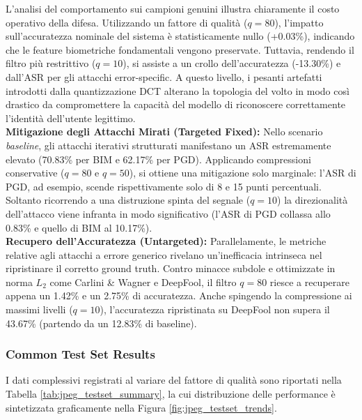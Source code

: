 \documentclass[a4paper, 12pt]{article}
\begin{document}
L'analisi del comportamento sui campioni genuini illustra chiaramente il costo operativo della difesa. 
Utilizzando un fattore di qualità ($q=80$), l'impatto sull'accuratezza nominale del sistema è statisticamente 
nullo (+0.03\%), indicando che le feature biometriche fondamentali vengono preservate. 
Tuttavia, rendendo il filtro più restrittivo ($q=10$), si assiste a un crollo dell'accuratezza (-13.30\%) 
e dall'ASR per gli attacchi error-specific. A questo livello, 
i pesanti artefatti introdotti dalla quantizzazione DCT alterano la topologia del volto in modo così drastico da compromettere la capacità del modello di riconoscere correttamente l'identità dell'utente legittimo.\\


\textbf{Mitigazione degli Attacchi Mirati (Targeted Fixed):} 
Nello scenario \textit{baseline}, gli attacchi iterativi strutturati manifestano un ASR estremamente elevato 
(70.83\% per BIM e 62.17\% per PGD). 
Applicando compressioni conservative ($q=80$ e $q=50$), si ottiene una mitigazione solo marginale: l'ASR di PGD, 
ad esempio, scende rispettivamente solo di 8 e 15 punti percentuali. Soltanto ricorrendo a una distruzione spinta del 
segnale ($q=10$) la direzionalità dell'attacco viene infranta in modo significativo 
(l'ASR di PGD collassa allo 0.83\% e quello di BIM al 10.17\%).
\vspace{5pt}\\
\textbf{Recupero dell'Accuratezza (Untargeted):}
Parallelamente, le metriche relative agli attacchi a errore generico rivelano un'inefficacia intrinseca nel 
ripristinare il corretto ground truth. Contro minacce subdole e ottimizzate in norma $L_2$ come Carlini 
\& Wagner e DeepFool, il filtro $q=80$ riesce a recuperare appena un 1.42\% e un 2.75\% di accuratezza. 
Anche spingendo la compressione ai massimi livelli ($q=10$), l'accuratezza ripristinata su DeepFool non 
supera il 43.67\% (partendo da un 12.83\% di baseline).



\subsubsection{Common Test Set Results}

I dati complessivi registrati al variare del fattore di qualità sono riportati nella Tabella \ref{tab:jpeg_testset_summary}, 
la cui distribuzione delle performance è sintetizzata graficamente nella Figura \ref{fig:jpeg_testset_trends}.
\end{document}
